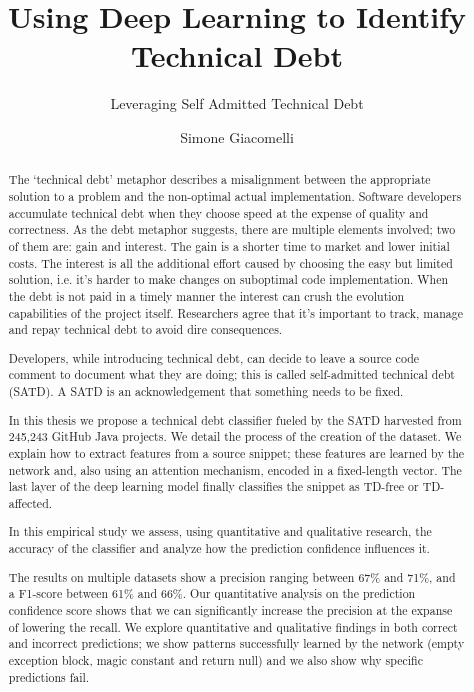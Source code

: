 \documentclass[11pt, mscthesis]{usiinfthesis}
\title{Using Deep Learning to Identify Technical Debt} %
\subtitle{Leveraging Self Admitted Technical Debt} %
\author{Simone Giacomelli} %
\begin{document}
\maketitle %

\frontmatter %

\begin{abstract}
The `technical debt' metaphor describes a misalignment between the appropriate solution to a problem and the non-optimal actual implementation. Software developers accumulate technical debt when they choose speed at the expense of quality and correctness. As the debt metaphor suggests, there are multiple elements involved; two of them are: gain and interest. The gain is a shorter time to market and lower initial costs. The interest is all the additional effort caused by choosing the easy but limited solution, i.e. it's harder to make changes on suboptimal code implementation. When the debt is not paid in a timely manner the interest can crush the evolution capabilities of the project itself. Researchers agree that it's important to track, manage and repay technical debt to avoid dire consequences.

Developers, while introducing technical debt, can decide to leave a source code comment to document what they are doing; this is called self-admitted technical debt (SATD). A SATD is an acknowledgement that something needs to be fixed.

In this thesis we propose a technical debt classifier fueled by the SATD harvested from 245,243 GitHub Java projects. We detail the process of the creation of the dataset. We explain how to extract features from a source snippet; these features are learned by the network and, also using an attention mechanism, encoded in a fixed-length vector. The last layer of the deep learning model finally classifies the snippet as TD-free or TD-affected.  

In this empirical study we assess, using quantitative and qualitative research, the accuracy of the classifier and analyze how the prediction confidence influences it.

The results on multiple datasets show a precision ranging between 67\% and 71\%, and a F1-score between 61\% and 66\%. Our quantitative analysis on the prediction confidence score shows that we can significantly increase the precision at the expanse of lowering the recall. 
We explore quantitative and qualitative findings in both correct and incorrect predictions; we show patterns successfully learned by the network (empty exception block, magic constant and return null) and we also show why specific predictions fail.



\end{abstract}
\end{document}
